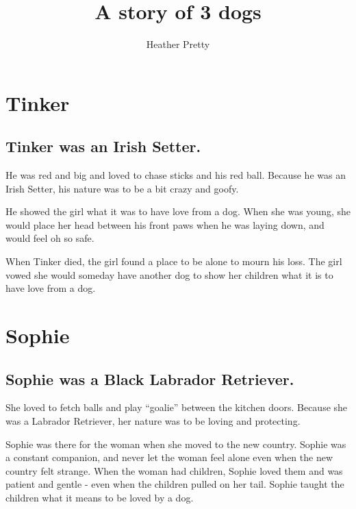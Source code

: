 \documentclass[
  openany]{book}
\title{A story of 3 dogs}
\author{Heather Pretty}
\date{}
\begin{document}
\maketitle

{
\setcounter{tocdepth}{1}
\tableofcontents
}
\hypertarget{tinker}{%
\chapter{Tinker}\label{tinker}}

\hypertarget{tinker-was-an-irish-setter.}{%
\section{Tinker was an Irish Setter.}\label{tinker-was-an-irish-setter.}}

He was red and big and loved to chase sticks and his red ball.
Because he was an Irish Setter, his nature was to be a bit crazy and goofy.

He showed the girl what it was to have love from a dog.
When she was young, she would place her head between his front paws when he was laying down, and would feel oh so safe.

When Tinker died, the girl found a place to be alone to mourn his loss.
The girl vowed she would someday have another dog to show her children what it is to have love from a dog.

\hypertarget{sophie}{%
\chapter{Sophie}\label{sophie}}

\hypertarget{sophie-was-a-black-labrador-retriever.}{%
\section{Sophie was a Black Labrador Retriever.}\label{sophie-was-a-black-labrador-retriever.}}

She loved to fetch balls and play ``goalie'' between the kitchen doors.
Because she was a Labrador Retriever, her nature was to be loving and protecting.

Sophie was there for the woman when she moved to the new country.
Sophie was a constant companion, and never let the woman feel alone even when the new country felt strange.
When the woman had children, Sophie loved them and was patient and gentle - even when the children pulled on her tail.
Sophie taught the children what it means to be loved by a dog.
\end{document}
